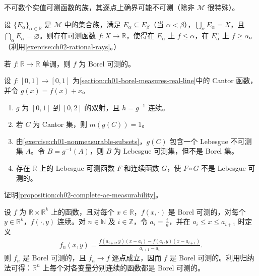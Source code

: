 \documentclass[../../main.tex]{subfiles}%
\begin{document}
\begin{exercise}\label{exercise:ch02-uncountable-supremum}
不可数个实值可测函数的族，其逐点上确界可能不可测（除非 $\mathscr{M}$ 很特殊）。
\end{exercise}
\begin{exercise}\label{exercise:ch02-level-family}
设 $\{E_\alpha\}_{\alpha\in\mathbb{R}}$ 是 $\mathscr{M}$ 中的集合族，满足 $E_\alpha\subseteq E_\beta$（当 $\alpha<\beta$），$\bigcup_\alpha E_\alpha=X$，且 $\bigcap_\alpha E_\alpha=\varnothing$。则存在可测函数 $f:X\to\mathbb{R}$，使得在 $E_\alpha$ 上 $f\le\alpha$，在 $E_\alpha^c$ 上 $f\ge\alpha$。（利用\cref{exercise:ch02-rational-rays}。）
\end{exercise}
\begin{exercise}\label{exercise:ch02-monotone-borel}
若 $f:\mathbb{R}\to\mathbb{R}$ 单调，则 $f$ 为 Borel 可测的。
\end{exercise}
\begin{exercise}\label{exercise:ch02-cantor-non-borel}
设 $f:[0,1]\to[0,1]$ 为\cref{section:ch01-borel-measures-real-line}中的 Cantor 函数，并令 $g(x)=f(x)+x$。
\begin{enumerate}
\item\label{item:ch02-cantor-homeomorphism} $g$ 为 $[0,1]$ 到 $[0,2]$ 的双射，且 $h=g^{-1}$ 连续。
\item\label{item:ch02-cantor-image-measure} 若 $C$ 为 Cantor 集，则 $m(g(C))=1$。
\item\label{item:ch02-cantor-non-borel-set} 由\cref{exercise:ch01-nonmeasurable-subsets}，$g(C)$ 包含一个 Lebesgue 不可测集 $A$。令 $B=g^{-1}(A)$，则 $B$ 为 Lebesgue 可测集，但不是 Borel 集。
\item\label{item:ch02-cantor-nonmeasurable-composition} 存在 $\mathbb{R}$ 上的 Lebesgue 可测函数 $F$ 和连续函数 $G$，使 $F\circ G$ 不是 Lebesgue 可测的。
\end{enumerate}
\end{exercise}
\begin{exercise}\label{exercise:ch02-complete-ae-proof}
证明\cref{proposition:ch02-complete-ae-measurability}。
\end{exercise}
\begin{exercise}\label{exercise:ch02-separate-continuity}
设 $f$ 为 $\mathbb{R}\times\mathbb{R}^k$ 上的函数，且对每个 $x\in\mathbb{R}$，$f(x,\cdot)$ 是 Borel 可测的，对每个 $y\in\mathbb{R}^k$，$f(\cdot,y)$ 连续。对 $n\in\mathbb{N}$ 及 $i\in\mathbb{Z}$，令 $a_i=\frac{i}{n}$，并在 $a_i\le x\le a_{i+1}$ 时定义
\begin{align*}
f_n(x,y)=\frac{f(a_{i+1},y)(x-a_i)-f(a_i,y)(x-a_{i+1})}{a_{i+1}-a_i}.
\end{align*}
则 $f_n$ 是 Borel 可测的，且 $f_n\to f$ 逐点成立，因而 $f$ 是 Borel 可测的。利用归纳法可得：$\mathbb{R}^n$ 上每个对各变量分别连续的函数都是 Borel 可测的。
\end{exercise}
\end{document}
